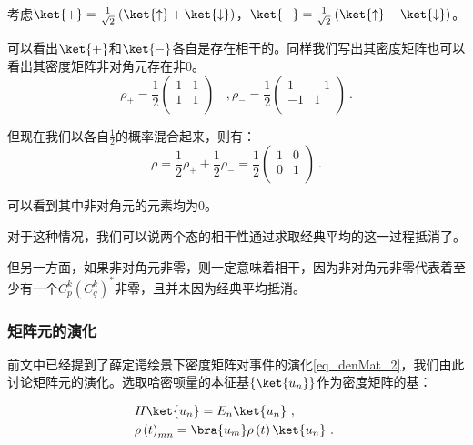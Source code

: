 \begin{example}{}
考虑$\ket{+} = \frac{1}{\sqrt{2}}\left(\ket{\uparrow} + \ket{\downarrow}\right)$，$\ket{-} = \frac{1}{\sqrt{2}}\left(\ket{\uparrow} - \ket{\downarrow}\right)$。

可以看出$\ket{+}$和$\ket{-}$各自是存在相干的。同样我们写出其密度矩阵也可以看出其密度矩阵非对角元存在非$0$。
\begin{equation}
\rho_+ =  \frac{1}{2}\begin{pmatrix}
1&1 \\
1&1 \\
\end{pmatrix}~~~~,
\rho_- =  \frac{1}{2}\begin{pmatrix}
1&-1 \\
-1&1 \\
\end{pmatrix}~.
\end{equation}

但现在我们以各自$\frac{1}{2}$的概率混合起来，则有：
$$\rho = \frac{1}{2}\rho_+ + \frac{1}{2}\rho_- = \frac{1}{2}\begin{pmatrix}
1&0 \\
0&1 \\
\end{pmatrix}~.$$

可以看到其中非对角元的元素均为$0$。
\end{example}

对于这种情况，我们可以说两个态的相干性通过求取经典平均的这一过程抵消了。

但另一方面，如果非对角元非零，则一定意味着相干，因为非对角元非零代表着至少有一个$C_p^k\left(C_q^k\right)^*$非零，且并未因为经典平均抵消。

\subsubsection{矩阵元的演化}

前文中已经提到了薛定谔绘景下密度矩阵对事件的演化\autoref{eq_denMat_2}，我们由此讨论矩阵元的演化。选取哈密顿量的本征基$\left\{\ket{u_n}\right\}$作为密度矩阵的基：

\begin{equation}
\begin{aligned}
&H \ket{u_n} = E_n \ket{u_n}~, \\ 
&\rho\left( t \right)_{mn} = \bra{u_m} \rho\left( t \right) \ket{u_n}~.
\end{aligned}~
\end{equation}

